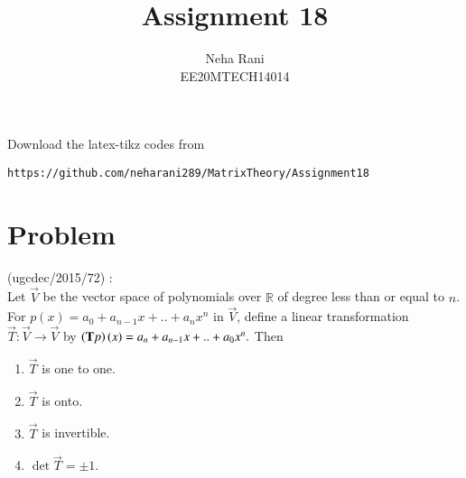 \documentclass[journal,12pt]{IEEEtran}
\begin{document}
     \def\rightbox#1{\makebox[0in][r]{#1}}
     \def\centbox#1{\makebox[0in]{#1}}
     \def\topbox#1{\raisebox{-\baselineskip}[0in][0in]{#1}}
     \def\midbox#1{\raisebox{-0.5\baselineskip}[0in][0in]{#1}}
\vspace{3cm}
\title{Assignment 18}
\author{Neha Rani\\EE20MTECH14014}
\maketitle
\bigskip
\renewcommand{\thefigure}{\theenumi}
\renewcommand{\thetable}{\theenumi}
%
Download the latex-tikz codes from 
%
\begin{lstlisting}
https://github.com/neharani289/MatrixTheory/Assignment18
\end{lstlisting}
\section{\textbf{Problem}}
%
 (ugcdec/2015/72) :\\
Let $\vec{V}$ be the vector space of polynomials over $\mathbb{R}$ of degree less than or equal to $n$. For $p(x)=a_0+a_{n-1}x+..+a_nx^{n}$ in $\vec{V}$, define a linear transformation $\vec{T}:\vec{V}\rightarrow \vec{V}$ by $\left(\mathbf{T}p\right)(x)=a_n+a_{n-1}x+..+a_0x^n.$ Then \\
\begin{enumerate}
    \item $\vec{T}$ is one to one.
    \item $\vec{T}$ is onto.
    \item $\vec{T}$ is invertible.
    \item $\det{\vec{T}}=\pm 1$.
\end{enumerate}
\end{document}

